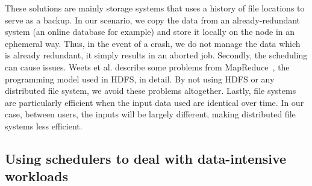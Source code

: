\documentclass[sigconf,review,anonymous]{acmart}
\begin{document}
These solutions are mainly storage systems that uses a history of file locations to serve as a backup.
In our scenario, we copy the data from an already-redundant system (an online database for example)
and store it locally on the node in an ephemeral way.
Thus, in the event of a crash, we do not manage the data which is already redundant, it simply results in an aborted job.
Secondly, the scheduling can cause issues. Weets et al. describe some problems from
MapReduce~\cite{issue_with_hdfs}, the programming model used in HDFS, in detail.
By not using HDFS or any distributed file system, we avoid these problems altogether. 
Lastly, file systems are particularly efficient when the input data used are identical over time.
In our case, between users, the inputs will be largely different, making distributed file systems less efficient.




\subsection{Using schedulers to deal with data-intensive workloads}
\end{document}
